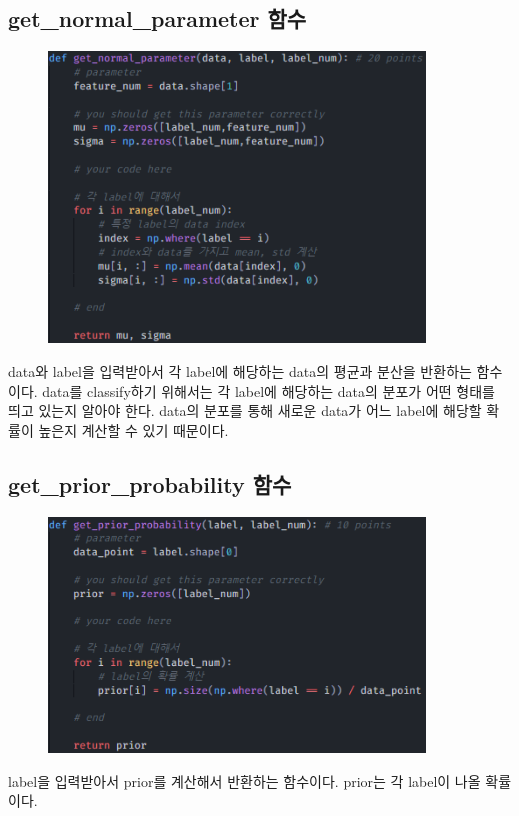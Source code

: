 \documentclass[12pt]{article}
\begin{document}
\subsection{get\_normal\_parameter 함수}
\begin{figure}[h]
	\includegraphics[width=10cm]{figures/image03.png}
\end{figure}
data와 label을 입력받아서 각 label에 해당하는 data의 평균과 분산을 반환하는 함수이다.
data를 classify하기 위해서는 각 label에 해당하는 data의 분포가 어떤 형태를 띄고 있는지 알아야 한다.
data의 분포를 통해 새로운 data가 어느 label에 해당할 확률이 높은지 계산할 수 있기 때문이다.

\subsection{get\_prior\_probability 함수}
\begin{figure}[h]
	\includegraphics[width=10cm]{figures/image04.png}
\end{figure}
label을 입력받아서 prior를 계산해서 반환하는 함수이다.
prior는 각 label이 나올 확률이다.
\end{document}
